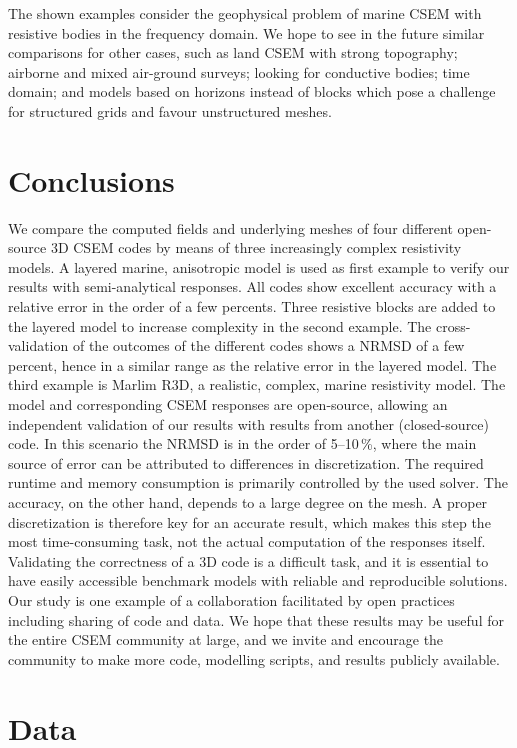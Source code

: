 \documentclass[onecolumn,extra,camera]{gji}
\begin{document}
The shown examples consider the geophysical problem of marine CSEM with resistive bodies in the frequency domain. We hope to see in the future similar comparisons for other cases, such as land CSEM with strong topography; airborne and mixed air-ground surveys; looking for conductive bodies; time domain; and models based on horizons instead of blocks which pose a challenge for structured grids and favour unstructured meshes.

\section{Conclusions}

We compare the computed fields and underlying meshes of four different open-source 3D CSEM codes by means of three increasingly complex resistivity models. A layered marine, anisotropic model is used as first example to verify our results with semi-analytical responses. All codes show excellent accuracy with a relative error in the order of a few percents. Three resistive blocks are added to the layered model to increase complexity in the second example. The cross-validation of the outcomes of the different codes shows a NRMSD of a few percent, hence in a similar range as the relative error in the layered model. The third example is Marlim R3D, a realistic, complex, marine resistivity model. The model and corresponding CSEM responses are open-source, allowing an independent validation of our results with results from another (closed-source) code. In this scenario the NRMSD is in the order of 5--10\,\%, where the main source of error can be attributed to differences in discretization. The required runtime and memory consumption is primarily controlled by the used solver. The accuracy, on the other hand, depends to a large degree on the mesh. A proper discretization is therefore key for an accurate result, which makes this step the most time-consuming task, not the actual computation of the responses itself. Validating the correctness of a 3D code is a difficult task, and it is essential to have easily accessible benchmark models with reliable and reproducible solutions. Our study is one example of a collaboration facilitated by open practices including sharing of code and data. We hope that these results may be useful for the entire CSEM community at large, and we invite and encourage the community to make more code, modelling scripts, and results publicly available.


\section{Data}
\end{document}
